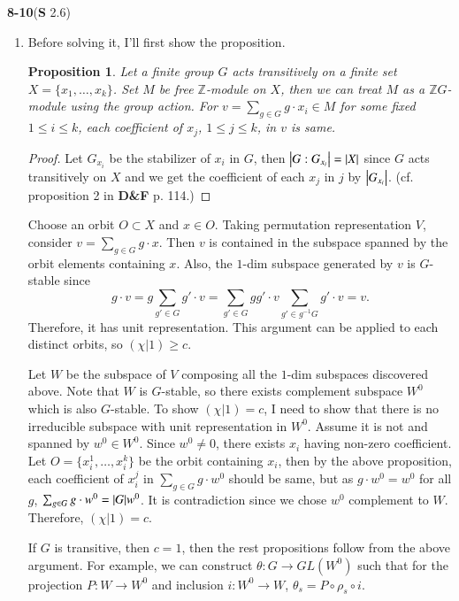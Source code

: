\documentclass[a4paper, 12pt]{article}
\theoremstyle{Mydefinition}
\theoremstyle{Mytheorem}
\newtheorem{proposition}[statement]{Proposition}
\begin{document}
\noindent \textbf{8-10}(\textbf{S} 2.6)
\begin{enumerate}
    \item Before solving it, I'll first show the proposition.
    \begin{proposition}
    Let a finite group $G$ acts transitively on a finite set $X = \{x_1, \ldots, x_k\}$. Set $M$ be free $\mathbb{Z}$-module on $X$, then we can treat $M$ as a $\mathbb{Z}G$-module using the group action. For $v = \sum_{g\in G}g\cdot x_i\in M$ for some fixed $1\leq i\leq k$, each coefficient of $x_j$, $1\leq j\leq k$, in $v$ is same.
    \end{proposition}
    \begin{proof}
    Let $G_{x_i}$ be the stabilizer of $x_i$ in $G$, then $\abs{G:G_{x_i}} = \abs{X}$ since $G$ acts transitively on $X$ and we get the coefficient of each $x_j$ in $j$ by $\abs{G_{x_i}}$. (cf. proposition 2 in \textbf{D\&F} p. 114.)
    \end{proof}
    Choose an orbit $O\subset X$ and $x\in O$. Taking permutation representation $V$, consider $v = \sum_{g\in G}g\cdot x$. Then $v$ is contained in the subspace spanned by the orbit elements containing $x$. Also, the $1$-dim subspace generated by $v$ is $G$-stable since 
    \begin{equation}
        g\cdot v = g\sum_{g'\in G}g'\cdot v=\sum_{g'\in G}gg'\cdot v \sum_{g'\in g^{-1}G}g'\cdot v= v.
    \end{equation}
    Therefore, it has unit representation. This argument can be applied to each distinct orbits, so $(\chi|1)\geq c$.
    
    Let $W$ be the subspace of $V$ composing all the $1$-dim subspaces discovered above. Note that $W$ is $G$-stable, so there exists complement subspace $W^0$ which is also $G$-stable. To show $(\chi|1) = c$, I need to show that there is no irreducible subspace with unit representation in $W^0$. Assume it is not and spanned by $w^0\in W^0$. Since $w^0\neq 0$, there exists $x_i$ having non-zero coefficient. Let $O=\{x^1_i, \ldots, x^k_i\}$ be the orbit containing $x_i$, then by the above proposition, each coefficient of $x^j_i$ in $\sum_{g\in G}g\cdot w^0$ should be same, but as $g\cdot w^0 = w^0$ for all $g$, $\sum_{g\in G}g\cdot w^0 = \abs{G}w^0$. It is contradiction since we chose $w^0$ complement to $W$. Therefore, $(\chi|1) = c$.
    
    If $G$ is transitive, then $c=1$, then the rest propositions follow from the above argument. For example, we can construct $\theta:G\rightarrow GL(W^0)$ such that for the projection $P:W\rightarrow W^0$ and inclusion $i:W^0\rightarrow W$, $\theta_s = P\circ \rho_s\circ i$.
    

\end{enumerate}
\end{document}

